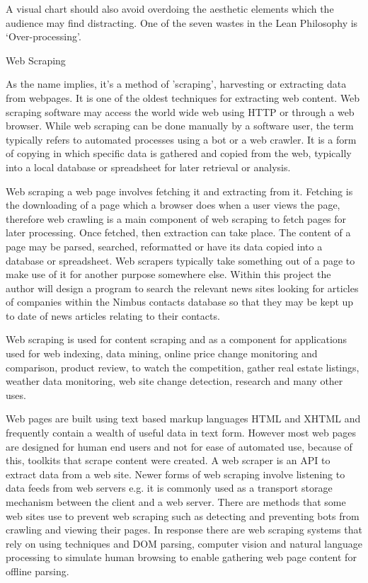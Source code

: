 A visual chart should also avoid overdoing the aesthetic elements which the audience may find distracting. One of the seven wastes in the Lean Philosophy is ‘Over-processing’. \cite{Dombrowski2014}


Web Scraping

As the name implies, it's a method of 'scraping', harvesting or extracting data from webpages. It is one of the oldest techniques for extracting web content. \cite{Glez-Pena2013a} Web scraping software may access the world wide web using HTTP or through a web browser. While web scraping can be done manually by a software user, the term typically refers to automated processes using a bot or a web crawler. It is a form of copying in which specific data is gathered and copied from the web, typically into a local database or spreadsheet for later retrieval or analysis.

Web scraping a web page involves fetching it and extracting from it. Fetching is the downloading of a page which a browser does when a user views the page, therefore web crawling is a main component of web scraping to fetch pages for later processing. Once fetched, then extraction can take place.
The content of a page may be parsed, searched, reformatted or have its data copied into a database or spreadsheet. Web scrapers typically take something out of a page to make use of it for another purpose somewhere else. Within this project the author will design a program to search the relevant news sites looking for articles of companies within the Nimbus contacts database so that they may be kept up to date of news articles relating to their contacts. 

Web scraping is used for content scraping and as a component for applications used for web indexing, data mining, online price change monitoring and comparison, product review, to watch the competition, gather real estate listings, weather data monitoring, web site change detection, research and many other uses.

Web pages are built using text based markup languages HTML and XHTML and frequently contain a wealth of useful data in text form. However most web pages are designed for human end users and not for ease of automated use, because of this, toolkits that scrape content were created. A web scraper is an API to extract data from a web site. Newer forms of web scraping involve listening to data feeds from web servers e.g. it is commonly used as a transport storage mechanism between the client and a web server.
There are methods that some web sites use to prevent web scraping such as detecting and preventing bots from crawling and viewing their pages. In response there are web scraping systems that rely on using techniques and DOM parsing, computer vision and natural language processing to simulate human browsing to enable gathering web page content for offline parsing.

